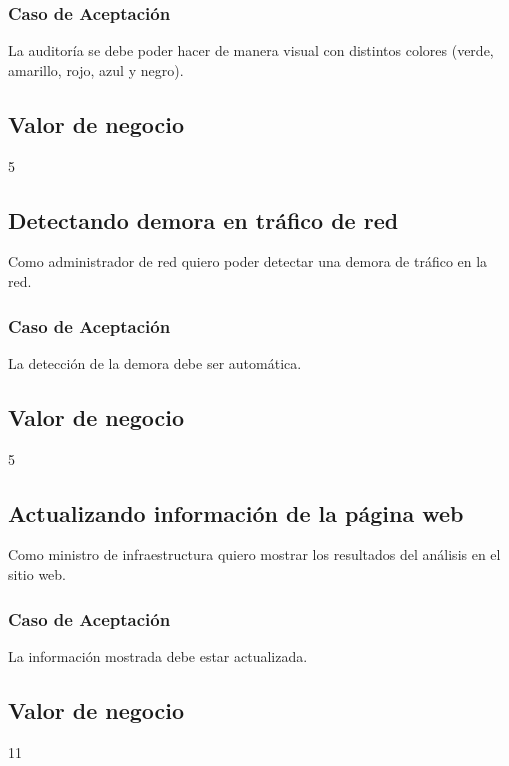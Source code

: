 \subsubsection*{Caso de Aceptación}
La auditoría se debe poder hacer de manera visual con distintos colores (verde, amarillo, rojo, azul y negro).
\subsection*{Valor de negocio}
5


\linea \subsection*{Detectando demora en tráfico de red}
Como administrador de red quiero poder  detectar una demora de tráfico en la red.
\subsubsection*{Caso de Aceptación}
La detección de la demora debe ser automática.
\subsection*{Valor de negocio}
5


\linea \subsection*{Actualizando información de la página web}
Como ministro de infraestructura quiero mostrar los resultados del análisis en el sitio web.
\subsubsection*{Caso de Aceptación}
La información mostrada debe estar actualizada.
\subsection*{Valor de negocio}
11


